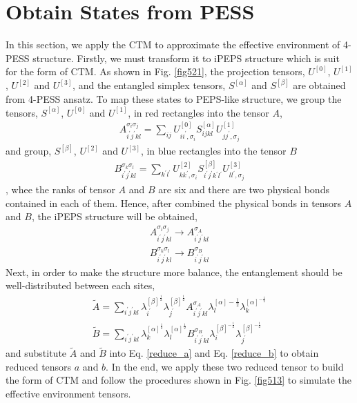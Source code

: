 \section{Obtain States from PESS}
\label{pessctm}
In this section, we apply the CTM to approximate the effective environment of 4-PESS structure. Firstly, we must transform it to iPEPS structure which is suit for the form of CTM. As shown in Fig. \ref{fig521}, the projection tensors, $U^{[0]}$, $U^{[1]}$, $U^{[2]}$ and $U^{[3]}$, and the entangled simplex tensors, $S^{[\alpha]}$ and $S^{[\beta]}$ are obtained from 4-PESS ansatz. To map these states to PEPS-like structure, we group the tensors, $S^{[\alpha]}$, $U^{[0]}$ and $U^{[1]}$, in red rectangles into the tensor $A$, 
\begin{align}
	A^{\sigma_i \sigma_j}_{i^{\prime}j^{\prime}kl} = \sum_{ij}{U^{[0]}_{ ii^{\prime},\sigma_i} S^{[\alpha]}_{ijkl} U^{[1]}_{ jj^{\prime},\sigma_j}}
\end{align}
and group, $S^{[\beta]}$, $U^{[2]}$ and $U^{[3]}$, in blue rectangles into the tensor $B$
\begin{align}
	B^{\sigma_k \sigma_l}_{i^{\prime}j^{\prime}kl} = \sum_{k^{\prime}l^{\prime}}{U^{[2]}_{ kk^{\prime},\sigma_i} S^{[\beta]}_{i^{\prime}j^{\prime}k^{\prime}l^{\prime}} U^{[3]}_{ ll^{\prime},\sigma_j}}
\end{align}
, whee the ranks of tensor $A$ and $B$ are six and there are two physical bonds contained in each of them. Hence, after combined the physical bonds in tensors $A$ and $B$, the iPEPS structure will be obtained,
\begin{align}
	A^{\sigma_i \sigma_j}_{i^{\prime}j^{\prime}kl} \rightarrow  A^{\sigma_A}_{i^{\prime}j^{\prime}kl} \\
	B^{\sigma_k \sigma_l}_{i^{\prime}j^{\prime}kl} \rightarrow  B^{\sigma_B}_{i^{\prime}j^{\prime}kl}
\end{align}
Next, in order to make the structure more balance, the entanglement should be well-distributed between each sites, 
\begin{align}
	\widetilde{A} = \sum_{i^{\prime}j^{\prime}kl}{\lambda^{[\beta]^{\frac{1}{2}}}_{i^{\prime}} \lambda^{[\beta]^{\frac{1}{2}}}_{j^{\prime}} A^{\sigma_A}_{i^{\prime}j^{\prime}kl}\lambda^{[\alpha]-\frac{1}{2}}_{l} \lambda^{[\alpha]^{-\frac{1}{2}}}_{k}}\\
	\widetilde{B} = \sum_{i^{\prime}j^{\prime}kl}{\lambda^{[\alpha]^{\frac{1}{2}}}_{k} \lambda^{[\alpha]^{\frac{1}{2}}}_{l} B^{\sigma_B}_{i^{\prime}j^{\prime}kl} \lambda^{[\beta]^{-\frac{1}{2}}}_{i} \lambda^{[\beta]^{-\frac{1}{2}}}_{j^{\prime}}}
\end{align}
and substitute $\widetilde{A}$ and $\widetilde{B}$ into Eq. \ref{reduce_a} and Eq. \ref{reduce_b} to obtain reduced tensors $a$ and $b$. In the end, we apply these two reduced tensor to build the form of CTM and follow the procedures shown in Fig. \ref{fig513} to simulate the effective environment tensors.

